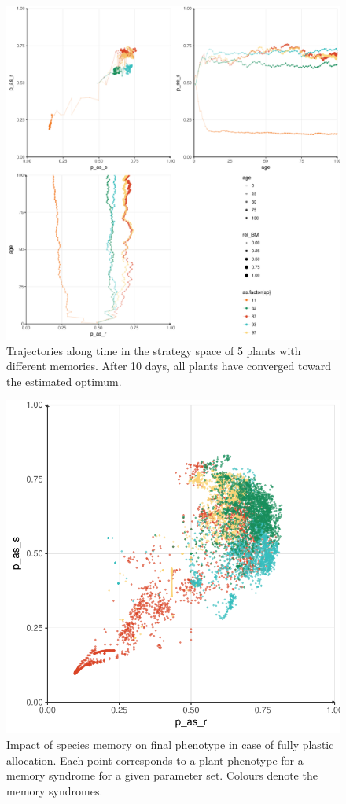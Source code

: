 \begin{figure}\label{fig:plastic_allocation_trajectory}
\includegraphics[width = \textwidth]{./2_PP/Figures/memory_effect.pdf}
\caption{Trajectories along time in the strategy space of 5 plants with different memories. After 10 days, all plants have converged toward the estimated optimum.}
\end{figure}

\begin{figure}\label{fig:memory_n_phenotype}
\includegraphics[width = \textwidth]{./2_PP/Figures/par_v_2D_points.pdf}
\caption{Impact of species memory on final phenotype in case of fully plastic allocation. Each point corresponds to a plant phenotype for a memory syndrome for a given parameter set. Colours denote the memory syndromes.}
\end{figure}



